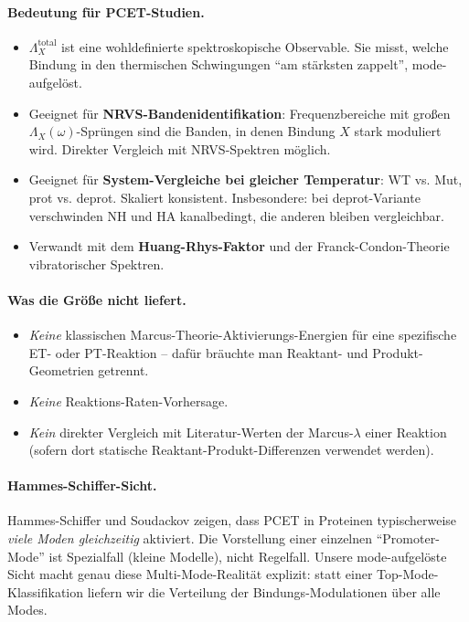 \documentclass[11pt,a4paper,twoside]{article}
\theoremstyle{remark}
\begin{document}
\paragraph{Bedeutung f\"ur PCET-Studien.}
\begin{itemize}\setlength{\itemsep}{0pt}
  \item $\Lambda_X^\text{total}$ ist eine wohldefinierte
        spektroskopische Observable. Sie misst, welche Bindung in den
        thermischen Schwingungen "`am st\"arksten zappelt"', mode-
        aufgel\"ost.
  \item Geeignet f\"ur \textbf{NRVS-Bandenidentifikation}:
        Frequenzbereiche mit gro{\ss}en
        $\Lambda_X(\omega)$-Spr\"ungen sind die Banden, in denen
        Bindung $X$ stark moduliert wird. Direkter Vergleich mit
        NRVS-Spektren m\"oglich.
  \item Geeignet f\"ur \textbf{System-Vergleiche bei gleicher
        Temperatur}: WT vs. Mut, prot vs. deprot. Skaliert konsistent.
        Insbesondere: bei deprot-Variante verschwinden NH und HA
        kanalbedingt, die anderen bleiben vergleichbar.
  \item Verwandt mit dem \textbf{Huang-Rhys-Faktor}
        \cite{HuangRhys1950} und der Franck-Condon-Theorie
        vibratorischer Spektren.
\end{itemize}

\paragraph{Was die Gr\"o{\ss}e nicht liefert.}
\begin{itemize}\setlength{\itemsep}{0pt}
  \item \emph{Keine} klassischen Marcus-Theorie-Aktivierungs-Energien
        f\"ur eine spezifische ET- oder PT-Reaktion -- daf\"ur br\"auchte
        man Reaktant- und Produkt-Geometrien getrennt.
  \item \emph{Keine} Reaktions-Raten-Vorhersage.
  \item \emph{Kein} direkter Vergleich mit Literatur-Werten der
        Marcus-$\lambda$ einer Reaktion (sofern dort statische
        Reaktant-Produkt-Differenzen verwendet werden).
\end{itemize}

\paragraph{Hammes-Schiffer-Sicht.}
Hammes-Schiffer und Soudackov \cite{HammesSchifferSoudackov2008}
zeigen, dass PCET in Proteinen typischerweise \emph{viele Moden
gleichzeitig} aktiviert. Die Vorstellung einer einzelnen
"`Promoter-Mode"' ist Spezialfall (kleine Modelle), nicht Regelfall.
Unsere mode-aufgel\"oste Sicht macht genau diese Multi-Mode-Realit\"at
explizit: statt einer Top-Mode-Klassifikation liefern wir die
Verteilung der Bindungs-Modulationen \"uber alle Modes.
\end{document}
